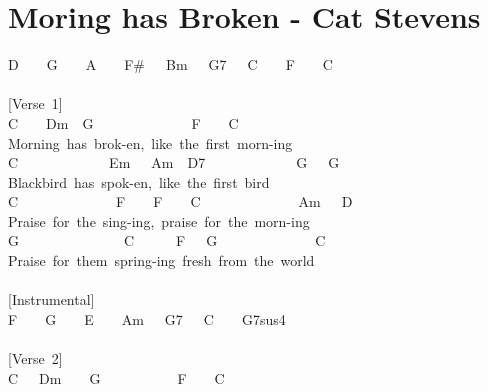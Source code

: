 \documentclass[]{book}
\let\stdsection\section
\renewcommand\section{\clearpage\stdsection}
\begin{document}
\hypertarget{moring-has-broken---cat-stevens}{%
\section{Moring has Broken - Cat Stevens}\label{moring-has-broken---cat-stevens}}

D~~~~G~~~~A~~~~F\#~~~Bm~~~G7~~~C~~~~F~~~~C\\
~\\
{[}Verse~1{]}\\
\hspace*{0.333em}\hspace*{0.333em}\hspace*{0.333em}\hspace*{0.333em}\hspace*{0.333em}\hspace*{0.333em}\hspace*{0.333em}\hspace*{0.333em}\hspace*{0.333em}\hspace*{0.333em}\hspace*{0.333em}\hspace*{0.333em}C~~~~Dm~~G~~~~~~~~~~~~~~F~~~~C\\
Morning~has~brok-en,~like~the~first~morn-ing\\
C~~~~~~~~~~~~~Em~~~Am~~D7~~~~~~~~~~~~~G~~~G\\
Blackbird~has~spok-en,~like~the~first~bird\\
C~~~~~~~~~~~~~~F~~~~F~~~~C~~~~~~~~~~~~~~Am~~~D\\
Praise~for~the~sing-ing,~praise~for~the~morn-ing\\
G~~~~~~~~~~~~~~~C~~~~~~F~~~G~~~~~~~~~~~~~~C\\
Praise~for~them~spring-ing~fresh~from~the~world\\
~\\
{[}Instrumental{]}\\
F~~~~G~~~~E~~~~Am~~~G7~~~C~~~~G7sus4\\
~\\
{[}Verse~2{]}\\
\hspace*{0.333em}\hspace*{0.333em}\hspace*{0.333em}\hspace*{0.333em}\hspace*{0.333em}\hspace*{0.333em}\hspace*{0.333em}\hspace*{0.333em}\hspace*{0.333em}\hspace*{0.333em}\hspace*{0.333em}\hspace*{0.333em}\hspace*{0.333em}\hspace*{0.333em}\hspace*{0.333em}\hspace*{0.333em}\hspace*{0.333em}C~~~Dm~~~~G~~~~~~~~~~~F~~~~C\\
\end{document}
